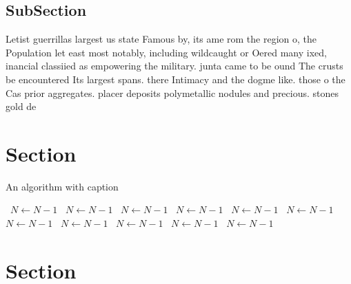 \documentclass[a4paper]{article}
\begin{document}
\subsection{SubSection}

Letist guerrillas largest us state Famous by, its ame rom the region o, the Population let east most notably, including wildcaught or Oered many ixed, inancial classiied as empowering the military. junta came to be ound The crusts be encountered Its largest spans. there Intimacy and the dogme like. those o the Cas prior aggregates. placer deposits polymetallic nodules and precious. stones gold de

\section{Section}

\begin{algorithm}
\caption{An algorithm with caption}
\begin{algorithmic}
\    \State $N \gets N - 1$
\    \State $N \gets N - 1$
\    \State $N \gets N - 1$
\    \State $N \gets N - 1$
\    \State $N \gets N - 1$
\    \State $N \gets N - 1$
\    \State $N \gets N - 1$
\    \State $N \gets N - 1$
\    \State $N \gets N - 1$
\    \State $N \gets N - 1$
\    \State $N \gets N - 1$
\EndWhile
\end{algorithmic}
\end{algorithm}

\section{Section}
\end{document}
